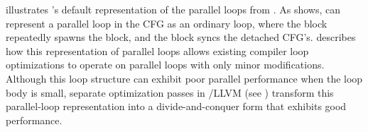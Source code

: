  illustrates \tapir's default representation
of the parallel loops from .  As
 shows, \tapir can represent a parallel loop
in the CFG as an ordinary loop, where the  block repeatedly
spawns the  block, and the  block syncs the
detached CFG's.   describes how this representation of
parallel loops allows existing compiler loop optimizations to operate
on \tapir parallel loops with only minor modifications.  Although this
loop structure can exhibit poor parallel performance when the loop
body is small, separate optimization passes in \tapir/\mbox{LLVM} (see
) transform this parallel-loop representation into a
divide-and-conquer form that exhibits good performance.



